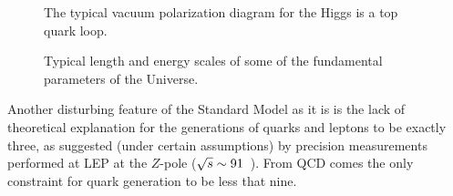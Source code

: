 \begin{figure}[htb]\begin{center}
\caption{The typical vacuum polarization diagram 
  for the Higgs is a top quark loop.}
\label{topLoop}\end{center}\end{figure}

\begin{figure}[h!tb]\begin{center}
        \subfigure{ %
}
	\caption{Typical length and energy scales
          of some of the fundamental parameters
          of the Universe.\label{fig:scales}}
\end{center}\end{figure}

Another disturbing feature of the Standard Model as it is 
is the lack of theoretical explanation for the generations 
of quarks and leptons to be exactly three, as suggested
(under certain assumptions) by precision measurements 
performed at LEP at the $Z$-pole ($\rts\sim 91$~\gev). 
From QCD comes the only constraint for quark generation
to be less that nine.

